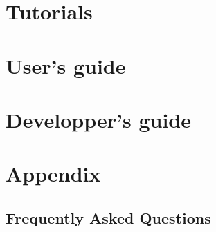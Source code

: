 \documentclass{InsightSoftwareGuide}
\newif\ifitkPrintedVersion
\begin{document}




\part{Tutorials}




\part{User's guide}




















\part{Developper's guide}





\part{Appendix}
\chapter{Frequently Asked Questions}
\label{sec:FrequentlyAskedQuestions}

\backmatter

%
%

% 




%
%



\end{document}
